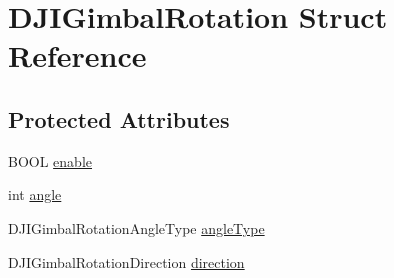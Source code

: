 \hypertarget{struct_d_j_i_gimbal_rotation}{\section{D\+J\+I\+Gimbal\+Rotation Struct Reference}
\label{struct_d_j_i_gimbal_rotation}
}
\subsection*{Protected Attributes}
\begin{DoxyCompactItemize}
\item 
B\+O\+O\+L \hyperlink{struct_d_j_i_gimbal_rotation_ad6555675f7a142ff111b99d3ae214a5c}{enable}
\item 
int \hyperlink{struct_d_j_i_gimbal_rotation_abbcc4b75198c5a4b913ad1c61c47e787}{angle}
\item 
D\+J\+I\+Gimbal\+Rotation\+Angle\+Type \hyperlink{struct_d_j_i_gimbal_rotation_a819cec735930ba905d227b6a73f55d56}{angle\+Type}
\item 
D\+J\+I\+Gimbal\+Rotation\+Direction \hyperlink{struct_d_j_i_gimbal_rotation_aeda6599ce4fbdd86a7a474e481f601ac}{direction}
\end{DoxyCompactItemize}


